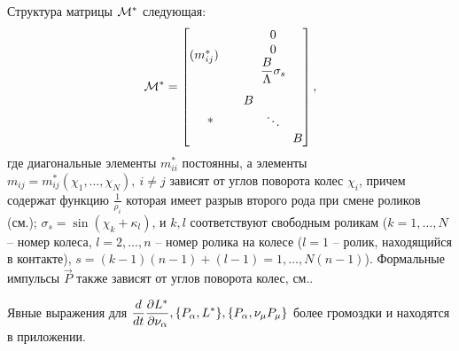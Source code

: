 Структура матрицы $\mathcal{M}^*$ следующая:
$$
\mathcal{M}^* = \begin{bmatrix}
        (m^*_{ij}) \quad & \begin{matrix} 0 \\ 0 \\ \displaystyle\frac{\displaystyle B}{\displaystyle \Lambda}\sigma_s \end{matrix} \\[25pt]
        *          & \begin{matrix} B & & \\ & \ddots & \\ & & B \end{matrix} \\
    \end{bmatrix},
$$
где диагональные элементы $m^*_{ii}$ постоянны, а элементы $m_{ij} = m^*_{ij}(\chi_1,\ldots,\chi_N),\ i\neq j$ зависят от углов поворота колес $\chi_i$, причем содержат функцию $\frac{1}{\rho_i}$ которая имеет разрыв второго рода при смене роликов (см.); $\sigma_s = \sin(\chi_k+\kappa_l)$, и $k, l$ соответствуют свободным роликам ($k = 1,\dots,N$ -- номер колеса, $l = 2,\ldots,n$ -- номер ролика на колесе ($l = 1$ -- ролик, находящийся в контакте), $s = (k-1)(n-1) + (l-1) = 1,\ldots,N(n-1)$). Формальные импульсы $\vec{P}$ также зависят от углов поворота колес, см..


Явные выражения для $\displaystyle\frac{\displaystyle d}{\displaystyle dt}\frac{\partial L^{*}}{\partial \nu_\alpha}, \{P_\alpha, L^{*}\}, \{P_\alpha, \nu_\mu P_\mu\}$ более громоздки и находятся в приложении.